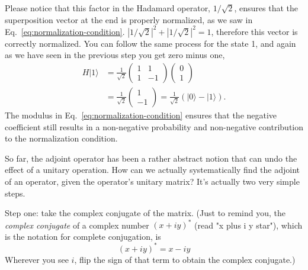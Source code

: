 Please notice that this factor in the Hadamard operator, $1/\sqrt{2}$, ensures that the superposition vector at the end is properly normalized, as we saw in Eq.~\ref{eq:normalization-condition}. $|1/\sqrt{2}|^2 + |1/\sqrt{2}|^2 = 1$, therefore this vector is correctly normalized. You can follow the same process for the state 1, and again as we have seen in the previous step you get zero minus one,
\begin{equation}
\begin{aligned}
H|1\rangle &=\frac{1}{\sqrt{2}}\left(\begin{array}{cc}
1 & 1 \\
1 & -1
\end{array}\right)\left(\begin{array}{l}
0 \\
1
\end{array}\right) \\
&=\frac{1}{\sqrt{2}}\left(\begin{array}{c}
1 \\
-1
\end{array}\right)=\frac{1}{\sqrt{2}}(|0\rangle-|1\rangle).
\end{aligned}
\end{equation}
The modulus in Eq.~\ref{eq:normalization-condition} ensures that the negative coefficient still results in a non-negative probability and non-negative contribution to the normalization condition.

So far, the adjoint operator has been a rather abstract notion that can undo the effect of a unitary operation. How can we actually systematically find the adjoint 
of an operator, given the operator's unitary matrix? It's actually two very simple steps.
 
Step one: take the complex conjugate of the matrix. (Just to remind you, the \emph{complex conjugate} of a complex number $(x+iy)^*$ (read "x plus i y star"), which is the notation for complete conjugation, is
\begin{equation}
(x+i y)^{*}=x-i y
\end{equation}
Wherever you see $i$, flip the sign of that term to obtain the complex conjugate.)

